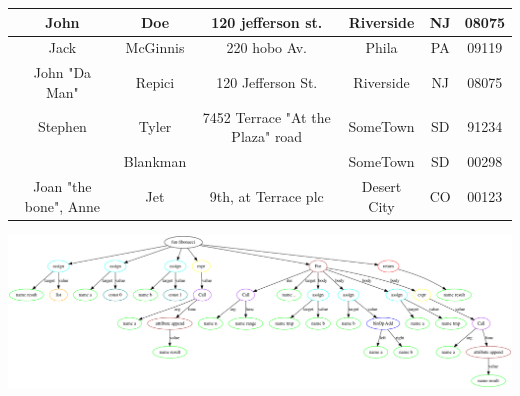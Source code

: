 \documentclass[10pt]{article}
\begin{document}
\begin{tabular}{ |c|c|c|c|c|c| }
\hline 
John & Doe & 120 jefferson st. & Riverside &  NJ &  08075 \\ 
\hline 
Jack & McGinnis & 220 hobo Av. & Phila &  PA & 09119 \\ 
\hline 
John "Da Man" & Repici & 120 Jefferson St. & Riverside &  NJ & 08075 \\ 
\hline 
Stephen & Tyler & 7452 Terrace "At the Plaza" road & SomeTown & SD &  91234 \\ 
\hline 
 & Blankman &  & SomeTown &  SD &  00298 \\ 
\hline 
Joan "the bone", Anne & Jet & 9th, at Terrace plc & Desert City & CO & 00123 \\ 
\hline 
\end{tabular}

\includegraphics[width=0.9\linewidth]{artifacts/ast.png}
\end{document}
